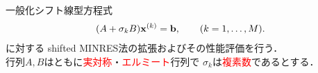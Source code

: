 

一般化シフト線型方程式
\begin{align*}
	(A + \sigma_{k}B)\vb{x}^{(k)} = \vb{b}, \qquad (k=1,\dots,M).
	\label{eq-gsls}
\end{align*}
に対する shifted MINRES法\cite{ref-SeitoH-2019}の拡張およびその性能評価を行う．\\
行列$A, B$はともに\textcolor{red}{実対称}・\textcolor{red}{エルミート}行列で $\sigma_{k}$は\textcolor{red}{複素数}であるとする．
